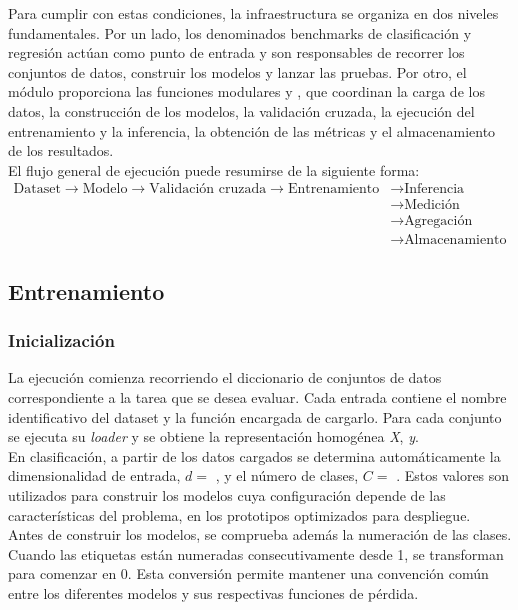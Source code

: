 \documentclass[a4paper,12pt,twoside,final]{book}
\begin{document}
Para cumplir con estas condiciones, la infraestructura se organiza en dos niveles fundamentales. Por un lado, los
denominados benchmarks de clasificación y regresión actúan como punto de entrada y son responsables de recorrer los
conjuntos de datos, construir los modelos y lanzar las pruebas. Por otro, el módulo  proporciona
las funciones modulares  y , que coordinan la carga de los datos, la
construcción de los modelos, la validación cruzada, la ejecución del entrenamiento y la inferencia, la obtención de las
métricas y el almacenamiento de los resultados.\\

El flujo general de ejecución puede resumirse de la siguiente forma:
\begin{align*}
  \text{Dataset} \rightarrow \text{Modelo} \rightarrow \text{Validación cruzada} \rightarrow \text{Entrenamiento}
  & \rightarrow \text{Inferencia} \\
  & \rightarrow \text{Medición} \\
  & \rightarrow \text{Agregación} \\
  & \rightarrow \text{Almacenamiento}
\end{align*}

\subsection{Entrenamiento}
\subsubsection{Inicialización}
La ejecución comienza recorriendo el diccionario de conjuntos de datos correspondiente a la tarea que se desea evaluar.
Cada entrada contiene el nombre identificativo del dataset y la función encargada de cargarlo. Para cada conjunto se
ejecuta su \textit{loader} y se obtiene la representación homogénea \textit{X}, \textit{y}.\\

En clasificación, a partir de los datos cargados se determina automáticamente la dimensionalidad de entrada,
$d =$ , y el número de clases, $C =$ . Estos valores son utilizados para
construir los modelos cuya configuración depende de las características del problema, en los prototipos optimizados
para despliegue.\\

Antes de construir los modelos, se comprueba además la numeración de las clases. Cuando las etiquetas están numeradas
consecutivamente desde 1, se transforman para comenzar en 0. Esta conversión permite mantener una convención común
entre los diferentes modelos y sus respectivas funciones de pérdida.\\
\end{document}
